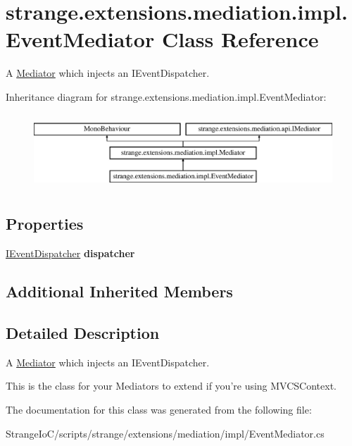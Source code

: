 \hypertarget{classstrange_1_1extensions_1_1mediation_1_1impl_1_1_event_mediator}{\section{strange.\-extensions.\-mediation.\-impl.\-Event\-Mediator Class Reference}
\label{classstrange_1_1extensions_1_1mediation_1_1impl_1_1_event_mediator}
}


A \hyperlink{classstrange_1_1extensions_1_1mediation_1_1impl_1_1_mediator}{Mediator} which injects an I\-Event\-Dispatcher.  


Inheritance diagram for strange.\-extensions.\-mediation.\-impl.\-Event\-Mediator\-:\begin{figure}[H]
\begin{center}
\leavevmode
\includegraphics[height=2.857143cm]{classstrange_1_1extensions_1_1mediation_1_1impl_1_1_event_mediator}
\end{center}
\end{figure}
\subsection*{Properties}
\begin{DoxyCompactItemize}
\item 
\hypertarget{classstrange_1_1extensions_1_1mediation_1_1impl_1_1_event_mediator_ab3d98daf5cff6502fd9430020181ff7e}{\hyperlink{interfacestrange_1_1extensions_1_1dispatcher_1_1eventdispatcher_1_1api_1_1_i_event_dispatcher}{I\-Event\-Dispatcher} {\bfseries dispatcher}}\label{classstrange_1_1extensions_1_1mediation_1_1impl_1_1_event_mediator_ab3d98daf5cff6502fd9430020181ff7e}

\end{DoxyCompactItemize}
\subsection*{Additional Inherited Members}


\subsection{Detailed Description}
A \hyperlink{classstrange_1_1extensions_1_1mediation_1_1impl_1_1_mediator}{Mediator} which injects an I\-Event\-Dispatcher. 

This is the class for your Mediators to extend if you're using M\-V\-C\-S\-Context. 

The documentation for this class was generated from the following file\-:\begin{DoxyCompactItemize}
\item 
Strange\-Io\-C/scripts/strange/extensions/mediation/impl/Event\-Mediator.\-cs\end{DoxyCompactItemize}
